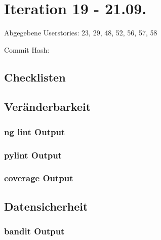 \section{Iteration 19 - 21.09.}
	Abgegebene Userstories: 23, 29, 48, 52, 56, 57, 58
	
	Commit Hash: 
	
	\subsection*{Checklisten}
	
	
	
	
	

	\subsection*{Veränderbarkeit}
	\subsubsection*{ng lint Output}
	

	\subsubsection*{pylint Output}
	

	\subsubsection*{coverage Output}
	

	\subsection*{Datensicherheit}

	\subsubsection*{bandit Output}
	
